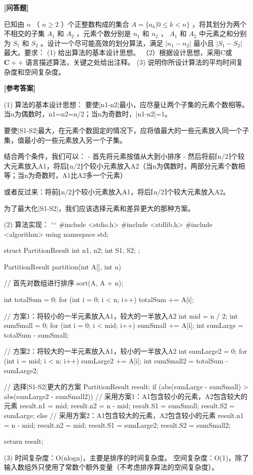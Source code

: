 \documentclass[12pt,a4paper]{article}
\newenvironment{choicequestion}[1][]{%
    \vspace{0.5cm}
    \noindent\textbf{[#1]}
    \vspace{0.2cm}
}{}
\newenvironment{answersection}{%
    \vspace{0.2cm}
    \noindent\textbf{[参考答案]}\\
    \vspace{0.1cm}
}{}
\newcounter{questioncounter}
\newcommand{\question}[2]{%
    \stepcounter{questioncounter}%
    \noindent\textbf{\thequestioncounter} #1%
}
\begin{document}
\begin{choicequestion}[问答题]
\question{已知由 $n$ （ $n \geqslant 2$ ）个正整数构成的集合 $A = \{a_{k} | 0 \leqslant k < n\}$ ，将其划分为两个不相交的子集 $A_{1}$ 和 $A_{2}$ ，元素个数分别是 $n_{1}$ 和 $n_{2}$ ， $A_{1}$ 和 $A_{2}$ 中元素之和分别为 $S_{1}$ 和 $S_{2}$ 。设计一个尽可能高效的划分算法，满足 $|n_{1} - n_{2}|$ 最小且 $|S_{1} - S_{2}|$ 最大。要求：\newline
(1) 给出算法的基本设计思想。  \newline
（2）根据设计思想，采用C或 $\mathbf{C} + +$ 语言描述算法，关键之处给出注释。  \newline
(3) 说明你所设计算法的平均时间复杂度和空间复杂度。}{}

\begin{answersection}
(1) 算法的基本设计思想：
要使|n1-n2|最小，应尽量让两个子集的元素个数相等。当n为偶数时，n1=n2=n/2；当n为奇数时，|n1-n2|=1。

要使|S1-S2|最大，在元素个数固定的情况下，应将值最大的一些元素放入同一个子集，值最小的一些元素放入另一个子集。

结合两个条件，我们可以：
- 首先将元素按值从大到小排序
- 然后将前⌈n/2⌉个较大元素放入A1，将后⌊n/2⌋个较小元素放入A2（当n为偶数时，两部分元素个数相等；当n为奇数时，A1比A2多一个元素）

或者反过来：将前⌊n/2⌋个较小元素放入A1，将后⌈n/2⌉个较大元素放入A2。

为了最大化|S1-S2|，我们应该选择元素和差异更大的那种方案。

(2) 算法实现：
```
#include <stdio.h>
#include <stdlib.h>
#include <algorithm>
using namespace std;

struct PartitionResult {
    int n1, n2;
    int S1, S2;
};

PartitionResult partition(int A[], int n) {
    // 首先对数组进行排序
    sort(A, A + n);
    
    int totalSum = 0;
    for (int i = 0; i < n; i++) {
        totalSum += A[i];
    }
    
    // 方案1：将较小的一半元素放入A1，较大的一半放入A2
    int mid = n / 2;
    int sumSmall = 0;
    for (int i = 0; i < mid; i++) {
        sumSmall += A[i];
    }
    int sumLarge = totalSum - sumSmall;
    
    // 方案2：将较大的一半元素放入A1，较小的一半放入A2
    int sumLarge2 = 0;
    for (int i = mid; i < n; i++) {
        sumLarge2 += A[i];
    }
    int sumSmall2 = totalSum - sumLarge2;
    
    // 选择|S1-S2|更大的方案
    PartitionResult result;
    if (abs(sumLarge - sumSmall) > abs(sumLarge2 - sumSmall2)) {
        // 采用方案1：A1包含较小的元素，A2包含较大的元素
        result.n1 = mid;
        result.n2 = n - mid;
        result.S1 = sumSmall;
        result.S2 = sumLarge;
    } else {
        // 采用方案2：A1包含较大的元素，A2包含较小的元素
        result.n1 = n - mid;
        result.n2 = mid;
        result.S1 = sumLarge2;
        result.S2 = sumSmall2;
    }
    
    return result;
}

(3) 时间复杂度：O(nlogn)，主要是排序的时间复杂度。
空间复杂度：O(1)，除了输入数组外只使用了常数个额外变量（不考虑排序算法的空间复杂度）。
\end{document}
